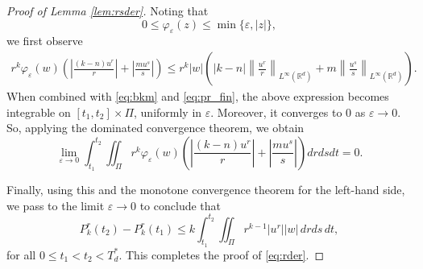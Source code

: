 \documentclass[11pt]{amsart}
\theoremstyle{definition}
\theoremstyle{remark}
\numberwithin{equation}{section}
\numberwithin{equation}{section}
\newcommand{\0}{\emptyset}
\begin{document}
\begin{proof}[Proof of Lemma \ref{lem:rsder}]
		Noting that \[ 0\le \varphi_{\varepsilon}(z)\le \min\{\varepsilon,|z|\}, \] we first observe
		\begin{align*} 
		r^k\varphi_{\varepsilon}(w) \left( \left|\frac{(k-n)u^r}{r}\right| +\left|\frac{mu^s}{s}\right| \right) \leq r^k|w| \left(|k-n| \left\|\frac{u^r}{r}\right\|_{L^\infty(\mathbb R^d)} + m \left\|\frac{u^s}{s}\right\|_{L^\infty(\mathbb R^d)} \right). 
		\end{align*}
		When combined with \eqref{eq:bkm} and \eqref{eq:pr_fin}, the above expression becomes integrable  on $[t_1,t_2]\times\Pi$, uniformly in $\varepsilon$. Moreover, it converges to $0$ as $\varepsilon \to 0$. So, applying the dominated convergence theorem, we obtain  
		\[ 
		\lim_{\varepsilon\to0} \int_{t_1}^{t_2}\!\!\iint_{\Pi} r^k\varphi_{\varepsilon}(w) \left( \left|\frac{(k-n)u^r}{r}\right| + \left|\frac{mu^s}{s}\right| \right) drdsdt=0.
		\]
		
		Finally, using this and the monotone convergence theorem for the left-hand side, we pass to the limit $\varepsilon\to0$ to conclude that 
		\[ 
		P_k^r(t_2)-P_k^r(t_1) \le k\int_{t_1}^{t_2} \iint_{\Pi} r^{k-1}|u^r||w|\,drds\,dt, 
		\] 
		for all $0\le t_1<t_2<T^*_d$. This completes the proof of \eqref{eq:rder}.
	\end{proof}
	
\end{document}
